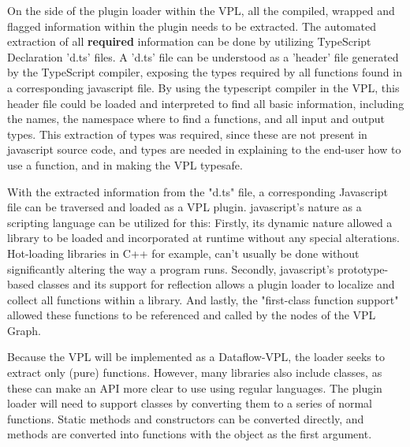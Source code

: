 


On the side of the plugin loader within the VPL, all the compiled, wrapped and flagged information within the plugin needs to be extracted. 
The automated extraction of all \textbf{required} information can be done by utilizing TypeScript Declaration 'd.ts' files. 
A 'd.ts' file can be understood as a 'header' file generated by the TypeScript compiler, exposing the types required by all functions found in a corresponding javascript file.
By using the typescript compiler in the VPL, this header file could be loaded and interpreted to find all basic information, including the names, the namespace where to find a functions, and all input and output types.
This extraction of types was required, since these are not present in javascript source code, and types are needed in explaining to the end-user how to use a function, and in making the VPL typesafe.

With the extracted information from the "d.ts" file, a corresponding Javascript file can be traversed and loaded as a VPL plugin. 
javascript's nature as a scripting language can be utilized for this:
Firstly, its dynamic nature allowed a library to be loaded and incorporated at runtime without any special alterations. 
Hot-loading libraries in C++ for example, can't usually be done without significantly altering the way a program runs. 
Secondly, javascript's prototype-based classes and its support for reflection allows a plugin loader to localize and collect all functions within a library.
And lastly, the "first-class function support" allowed these functions to be referenced and called by the nodes of the VPL Graph. 

Because the VPL will be implemented as a Dataflow-VPL, the loader seeks to extract only (pure) functions. 
However, many libraries also include classes, as these can make an API more clear to use using regular languages. 
The plugin loader will need to support classes by converting them to a series of normal functions. 
Static methods and constructors can be converted directly, and methods are converted into functions with the object as the first argument.

